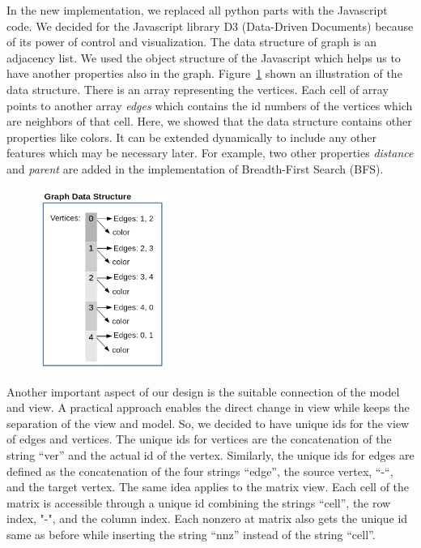 \documentclass[11pt, twoside,a4paper]{book}
\begin{document}
In the new implementation, we replaced all python parts with the Javascript code.
We decided for the Javascript library D3 (Data-Driven Documents)
because of its power of control and visualization.
The data structure of graph is an adjacency list.
We used the object structure of the Javascript which helps us to have another
properties also in the graph. Figure~\ref{f.graph-ds} shown an illustration
of the data structure. There is an array representing the vertices.
Each cell of array points to another array \textit{edges} which contains
the id numbers of the vertices which are neighbors of that cell.
Here, we showed that the data structure contains other properties like colors.
It can be extended dynamically to include any other features which may be necessary later. For example, two other properties \textit{distance} and \textit{parent} are added
in the implementation of Breadth-First Search (BFS).

\begin{figure}
\centering
\includegraphics[width=0.38\textwidth]{graph}
\caption{}
\label{f.graph-ds}
\end{figure}

Another important aspect of our design is the suitable connection of the
model and view. A practical approach enables the direct change in view while keeps the
separation of the view and model. So, we decided to have unique ids for the view of
edges and vertices. The unique ids for vertices are the concatenation of the
string “ver” and the actual id of the vertex. Similarly, the unique ids for edges are
defined as the concatenation of the four strings “edge”, the source vertex, “-“,
and the target vertex. The same idea applies to the matrix view. Each cell of the matrix
is accessible through a unique id combining the strings “cell”, the row index,
"-", and the column index. Each nonzero at matrix also gets the unique id same as before
while inserting the string “nnz” instead of the string “cell”.
\end{document}
